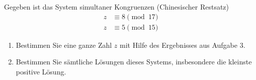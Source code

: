 \begin{aufgabe}
Gegeben ist das System simultaner Kongruenzen (Chinesischer Restsatz)
\begin{align*}
  z &\equiv 8 \pmod{17}\\
  z &\equiv 5 \pmod{15}
\end{align*}
\begin{enumerate}[label=\alph*)]
  \item Bestimmen Sie eine ganze Zahl $z$ mit Hilfe des Ergebnisses aus Aufgabe 3.
  \item Bestimmen Sie sämtliche Lösungen dieses Systems, insbesondere die kleinste positive Lösung.
\end{enumerate}
\end{aufgabe}
